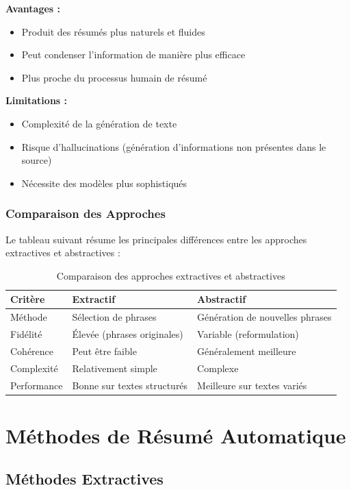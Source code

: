 \textbf{Avantages :}
\begin{itemize}
    \item Produit des résumés plus naturels et fluides
    \item Peut condenser l'information de manière plus efficace
    \item Plus proche du processus humain de résumé
\end{itemize}

\textbf{Limitations :}
\begin{itemize}
    \item Complexité de la génération de texte
    \item Risque d'hallucinations (génération d'informations non présentes dans le source)
    \item Nécessite des modèles plus sophistiqués
\end{itemize}

\subsubsection{Comparaison des Approches}

Le tableau suivant résume les principales différences entre les approches extractives et abstractives :

\begin{table}[h]
\centering
\begin{tabular}{|l|p{6cm}|p{6cm}|}
\hline
\textbf{Critère} & \textbf{Extractif} & \textbf{Abstractif} \\
\hline
Méthode & Sélection de phrases & Génération de nouvelles phrases \\
\hline
Fidélité & Élevée (phrases originales) & Variable (reformulation) \\
\hline
Cohérence & Peut être faible & Généralement meilleure \\
\hline
Complexité & Relativement simple & Complexe \\
\hline
Performance & Bonne sur textes structurés & Meilleure sur textes variés \\
\hline
\end{tabular}
\caption{Comparaison des approches extractives et abstractives}
\end{table}

\section{Méthodes de Résumé Automatique}

\subsection{Méthodes Extractives}

